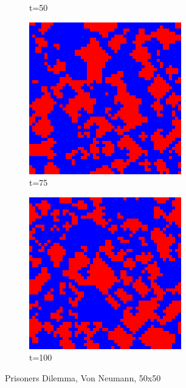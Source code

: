\documentclass[a4paper, 11pt]{article}
\begin{document}
\begin{figure}[H]
\begin{subfigure}{.25\textwidth}
  \caption{t=50}
\end{subfigure}%
\begin{subfigure}{.25\textwidth}
  \centering
  \includegraphics[width=0.9\linewidth]{PRISONERS_DILEMMA_VON_NEUMANN_50x50_t75}
  \caption{t=75}
\end{subfigure}%
\begin{subfigure}{.25\textwidth}
  \centering
  \includegraphics[width=0.9\linewidth]{PRISONERS_DILEMMA_VON_NEUMANN_50x50_t100}
  \caption{t=100}
\end{subfigure}
\caption{Prisoners Dilemma, Von Neumann, 50x50}
\end{figure}
\end{document}
